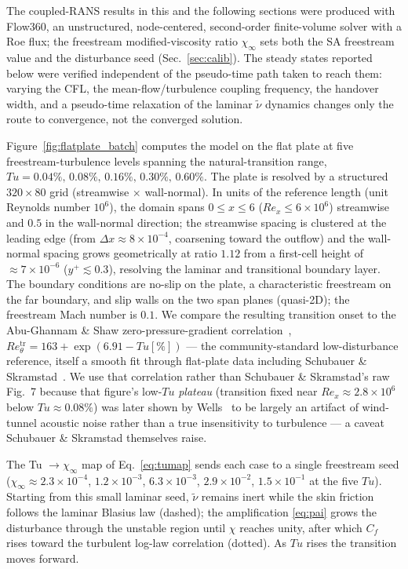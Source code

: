 \documentclass[journal]{new-aiaa}
\begin{document}
The coupled-RANS results in this and the following sections were produced with
Flow360, an unstructured, node-centered, second-order finite-volume solver with
a Roe flux; the
freestream modified-viscosity ratio $\chi_\infty$ sets both the SA freestream value
and the disturbance seed (Sec.~\ref{sec:calib}). The steady states reported below
were verified independent of the pseudo-time path taken to reach them: varying
the CFL, the mean-flow/turbulence coupling frequency, the handover width, and a
pseudo-time relaxation of the laminar $\tilde\nu$ dynamics changes only the
route to convergence, not the converged solution.

Figure~\ref{fig:flatplate_batch} computes the model on the flat plate at five
freestream-turbulence levels spanning the natural-transition
range, $Tu\!=\!0.04\%,\,0.08\%,\,0.16\%,\,0.30\%,\,0.60\%$. The plate is
resolved by a structured $320\!\times\!80$ grid (streamwise $\times$
wall-normal). In units of the reference length (unit Reynolds
number $10^6$), the domain spans $0\!\le\!x\!\le\!6$
($Re_x\!\le\!6\!\times\!10^6$) streamwise and $0.5$ in the wall-normal direction;
the streamwise spacing is clustered at the leading edge (from
$\Delta x\!\approx\!8\!\times\!10^{-4}$, coarsening toward the outflow) and the
wall-normal spacing grows geometrically at ratio $1.12$ from a first-cell height
of $\approx\!7\!\times\!10^{-6}$ ($y^+\!\lesssim\!0.3$), resolving the laminar and
transitional boundary layer. The boundary conditions are no-slip on the plate, a
characteristic freestream on the far boundary, and slip walls on the two span
planes (quasi-2D); the freestream Mach number is $0.1$. We compare the
resulting transition onset to the Abu-Ghannam \&
Shaw zero-pressure-gradient
correlation~\cite{abu_ghannam_shaw_1980}, $Re_\theta^\mathrm{tr}\!=\!163+\exp(6.91-Tu[\%])$ --- the
community-standard low-disturbance reference, itself a smooth fit through
flat-plate data including Schubauer \& Skramstad~\cite{schubauer_skramstad_1948}.
We use that correlation rather than Schubauer \& Skramstad's raw
Fig.~7 because that figure's low-$Tu$ \emph{plateau} (transition
fixed near $Re_x\!\approx\!2.8\!\times\!10^6$ below $Tu\!\approx\!0.08\%$) was
later shown by Wells~\cite{wells_1967} to be largely an artifact of
wind-tunnel acoustic noise rather than a true insensitivity to turbulence ---
a caveat Schubauer \& Skramstad themselves raise.

The Tu $\to\chi_\infty$ map of Eq.~\eqref{eq:tumap} sends each case to a single
freestream seed
($\chi_\infty\!\approx\!2.3\!\times\!10^{-4}$, $1.2\!\times\!10^{-3}$,
$6.3\!\times\!10^{-3}$, $2.9\!\times\!10^{-2}$, $1.5\!\times\!10^{-1}$ at the
five $Tu$). Starting from this small laminar seed, $\tilde\nu$ remains inert
while the skin friction follows the laminar Blasius law (dashed); the
amplification \eqref{eq:pai} grows the disturbance through the unstable region
until $\chi$ reaches unity, after which $C_f$ rises toward the turbulent
log-law correlation (dotted). As $Tu$ rises the transition moves
forward.
\end{document}
